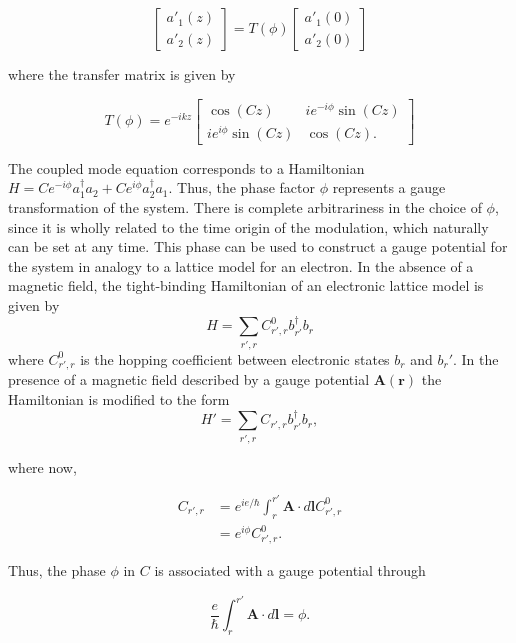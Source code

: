 \begin{equation}
\begin{bmatrix}
a'_1(z) \\
a'_2(z)
\end{bmatrix}
= T(\phi)
\begin{bmatrix}
a'_1(0) \\
a'_2(0)
\end{bmatrix}
\end{equation}

where the transfer matrix is given by 

\begin{equation}
T(\phi) = e^{-ikz} \begin{bmatrix}
\cos(Cz) & ie^{-i\phi} \sin(Cz) \\
ie^{i\phi} \sin(Cz) & \cos(Cz) .
\end{bmatrix}
\end{equation}

The coupled mode equation corresponds to a Hamiltonian $H = Ce^{-i\phi} a_1^\dagger a_2 + Ce^{i \phi} a_2^\dagger a_1$. Thus, the phase factor $\phi$ represents a gauge transformation of the system. There is complete arbitrariness in the choice of $\phi$, since it is wholly related to the time origin of the modulation, which naturally can be set at any time. This phase can be used to construct a gauge potential for the system in analogy to a lattice model for an electron. In the absence of a magnetic field, the tight-binding Hamiltonian of an electronic lattice model is given by 
\begin{equation}
H = \sum_{r',r} C_{r',r}^0 b_{r'}^\dagger b_r
\end{equation}
where $C_{r',r}^0$ is the hopping coefficient between electronic states $b_r$ and $b_r'$. In the presence of a magnetic field described by a gauge potential $\bm{A}(\bm{r})$ the Hamiltonian is modified to the form 
\begin{equation}
H' = \sum_{r',r} C_{r',r} b_{r'}^{\dagger} b_r,
\end{equation}

where now,

\begin{align}
C_{r',r} &= e^{ie/\hbar} \int_{r}^{r'} \bm{A} \cdot d\bm{l} C_{r',r}^0 \\
 &= e^{i \phi} C_{r',r}^0.
\end{align}

Thus, the phase $\phi$ in $C$ is associated with a gauge potential through 

\begin{equation}
\dfrac{e}{\hbar} \int_{r}^{r'} \bm{A} \cdot d \bm{l} = \phi.
\end{equation}

